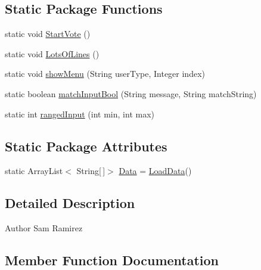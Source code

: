 \subsection*{Static Package Functions}
\begin{DoxyCompactItemize}
\item 
static void \mbox{\hyperlink{classjsonbasedvoting_1_1_json_based_voting_af1f7fe5298bdbc867a4d9ebc3fc2fe17}{Start\+Vote}} ()
\item 
static void \mbox{\hyperlink{classjsonbasedvoting_1_1_json_based_voting_a6f3f1426563435fa14b0e1fb9cf97032}{Lots\+Of\+Lines}} ()
\item 
static void \mbox{\hyperlink{classjsonbasedvoting_1_1_json_based_voting_af61183833b01be4d0203f82a6213eb1d}{show\+Menu}} (String user\+Type, Integer index)
\item 
static boolean \mbox{\hyperlink{classjsonbasedvoting_1_1_json_based_voting_a673611911f12dcd3b928673fe7d839a8}{match\+Input\+Bool}} (String message, String match\+String)
\item 
static int \mbox{\hyperlink{classjsonbasedvoting_1_1_json_based_voting_afd126df60c7e38e0fe9064a374d94e7f}{ranged\+Input}} (int min, int max)
\end{DoxyCompactItemize}
\subsection*{Static Package Attributes}
\begin{DoxyCompactItemize}
\item 
static Array\+List$<$ String\mbox{[}$\,$\mbox{]}$>$ \mbox{\hyperlink{classjsonbasedvoting_1_1_json_based_voting_a2450ce5604c5512836d2739373c6245e}{Data}} = \mbox{\hyperlink{classjsonbasedvoting_1_1_json_based_voting_adbcb2c2a084932df90996c7199251579}{Load\+Data}}()
\end{DoxyCompactItemize}


\subsection{Detailed Description}
\begin{DoxyAuthor}{Author}
Sam Ramirez 
\end{DoxyAuthor}


\subsection{Member Function Documentation}
\mbox{\label{classjsonbasedvoting_1_1_json_based_voting_a2812b6974dc14e6068d01736d81c41c3}} 
